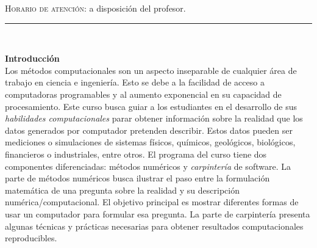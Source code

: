 \documentclass[letterpaper,10pt,onecolumn]{article}
\begin{document}
\noindent\textsc{Horario de atenci\'on:} a disposici\'on del profesor. 
\\[-0.1cm]






\noindent\rule{\textwidth}{1pt}\\[-0.1cm]

\addtocounter{mysection}{1}

\noindent\textbf{\large {} \quad Introducci\'on}\\[-0.2cm]


\noindent\normalsize Los m\'etodos computacionales son un aspecto
inseparable de cualquier \'area de trabajo en ciencia e ingenier\'ia.
Esto se debe a la facilidad de acceso a 
computadoras programables  y al aumento exponencial en su capacidad de
procesamiento. 
Este curso busca guiar a los estudiantes en el desarrollo de sus
\emph{habilidades computacionales} parar obtener informaci\'on sobre
la realidad que los datos generados por computador pretenden
describir.    
Estos datos pueden ser mediciones o simulaciones de
sistemas f\'isicos, qu\'imicos, geol\'ogicos, biol\'ogicos,
financieros o industriales, entre otros.     
El programa del curso tiene dos componentes diferenciadas: m\'etodos
num\'ericos  y \emph{carpinter\'ia} de software.  
La parte de m\'etodos num\'ericos busca ilustrar el paso entre la
formulaci\'on matem\'atica de una pregunta sobre la realidad y su
descripci\'on num\'erica/computacional.
El objetivo principal es mostrar diferentes formas de usar un
computador para formular esa pregunta.
La parte de carpinter\'ia presenta algunas t\'ecnicas y
pr\'acticas necesarias para obtener resultados computacionales reproducibles.     
\\[0.1cm] 
\end{document}
